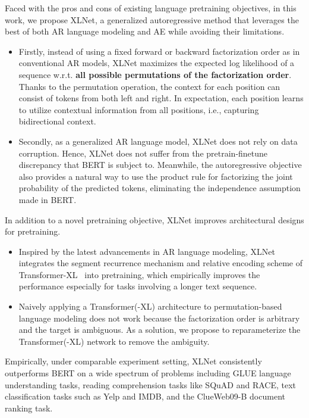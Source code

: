 \documentclass{article}
\begin{document}
Faced with the pros and cons of existing language pretraining objectives, in this work, we propose XLNet, a generalized autoregressive method that leverages the best of both AR language modeling and AE while avoiding their limitations.
\begin{itemize}[leftmargin=*,topsep=0em,itemsep=0em,parsep=0.2em]
\item Firstly, instead of using a fixed forward or backward factorization order as in conventional AR models, XLNet maximizes the expected log likelihood of a sequence w.r.t. \textbf{all possible permutations of the factorization order}.
Thanks to the permutation operation, the context for each position can consist of tokens from both left and right.
In expectation, each position learns to utilize contextual information from all positions, i.e., capturing bidirectional context.

\item Secondly, as a generalized AR language model, XLNet does not rely on data corruption. 
Hence, XLNet does not suffer from the pretrain-finetune discrepancy that BERT is subject to.
Meanwhile, the autoregressive objective also provides a natural way to use the product rule for factorizing the joint probability of the predicted tokens, eliminating the independence assumption made in BERT.
\end{itemize}

In addition to a novel pretraining objective, XLNet improves architectural designs for pretraining.
\begin{itemize}[leftmargin=*,topsep=0em,itemsep=0em,parsep=0.2em]
\item Inspired by the latest advancements in AR language modeling, XLNet integrates the segment recurrence mechanism and relative encoding scheme of Transformer-XL~\cite{dai2019transformer} into pretraining, which empirically improves the performance especially for tasks involving a longer text sequence.
\item Naively applying a Transformer(-XL) architecture to permutation-based language modeling does not work because the factorization order is arbitrary and the target is ambiguous. As a solution, we propose to reparameterize the Transformer(-XL) network to remove the ambiguity.
\end{itemize}


Empirically, under comparable experiment setting, XLNet consistently outperforms BERT \cite{devlin2018bert} on a wide spectrum of problems including GLUE language understanding tasks, reading comprehension tasks like SQuAD and RACE, text classification tasks such as Yelp and IMDB, and the ClueWeb09-B document ranking task.
\end{document}
